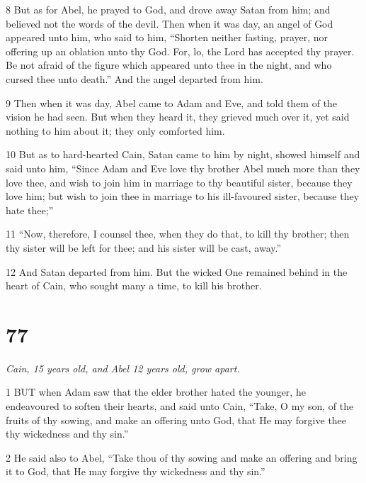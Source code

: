 \par 8 But as for Abel, he prayed to God, and drove away Satan from him; and believed not the words of the devil. Then when it was day, an angel of God appeared unto him, who said to him, “Shorten neither fasting, prayer, nor offering up an oblation unto thy God. For, lo, the Lord has accepted thy prayer. Be not afraid of the figure which appeared unto thee in the night, and who cursed thee unto death.” And the angel departed from him.

\par 9 Then when it was day, Abel came to Adam and Eve, and told them of the vision he had seen. But when they heard it, they grieved much over it, yet said nothing to him about it; they only comforted him.

\par 10 But as to hard-hearted Cain, Satan came to him by night, showed himself and said unto him, “Since Adam and Eve love thy brother Abel much more than they love thee, and wish to join him in marriage to thy beautiful sister, because they love him; but wish to join thee in marriage to his ill-favoured sister, because they hate thee;”

\par 11 “Now, therefore, I counsel thee, when they do that, to kill thy brother; then thy sister will be left for thee; and his sister will be cast, away.”

\par 12 And Satan departed from him. But the wicked One remained behind in the heart of Cain, who sought many a time, to kill his brother.



\chapter{77}

\par \textit{Cain, 15 years old, and Abel 12 years old, grow apart.}

\par 1 BUT when Adam saw that the elder brother hated the younger, he endeavoured to soften their hearts, and said unto Cain, “Take, O my son, of the fruits of thy sowing, and make an offering unto God, that He may forgive thee thy wickedness and thy sin.”

\par 2 He said also to Abel, “Take thou of thy sowing and make an offering and bring it to God, that He may forgive thy wickedness and thy sin.”


